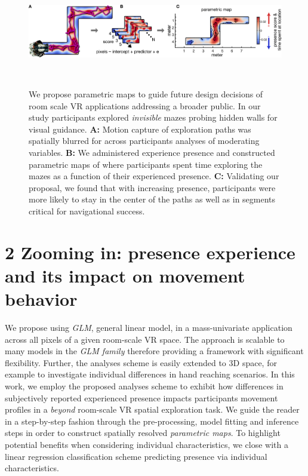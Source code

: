 \begin{figure}[!ht]
\centering
  \includegraphics[width=\linewidth]{figures/fig1.pdf}
  \caption{We propose parametric maps to guide future design decisions of room scale VR applications addressing a broader public. In our study participants explored \textit{invisible} mazes probing hidden walls for visual guidance. \textbf{A:} Motion capture of exploration paths was spatially blurred for across participants analyses of moderating variables. \textbf{B:} We administered experience presence and constructed parametric maps of where participants spent time exploring the mazes as a function of their experienced presence. \textbf{C:} Validating our proposal, we found that with increasing presence, participants were more likely to stay in the center of the paths as well as in segments critical for navigational success.}~\label{fig:methods}
\end{figure}

\section{2 Zooming in: presence experience and its impact on movement behavior}
We propose using \textit{GLM}, general linear model, in a mass-univariate application across all pixels of a given room-scale VR space. The approach is scalable to many models in the \textit{GLM family} therefore providing a framework with significant flexibility. Further, the analyses scheme is easily extended to 3D space, for example to investigate individual differences in hand reaching scenarios. In this work, we employ the proposed analyses scheme to exhibit how differences in subjectively reported experienced presence impacts participants movement profiles in a \textit{beyond} room-scale VR spatial exploration task. We guide the reader in a step-by-step fashion through the pre-processing, model fitting and inference steps in order to construct spatially resolved \textit{parametric maps}. To highlight potential benefits when considering individual characteristics, we close with a linear regression classification scheme predicting presence via individual characteristics.

